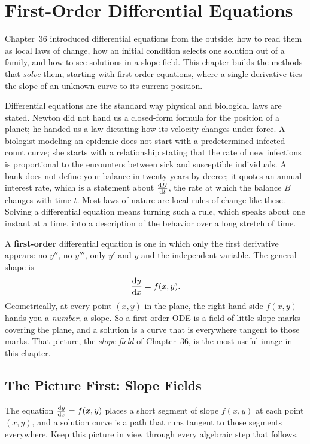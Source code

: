 \chapter{First-Order Differential Equations}

Chapter~36 introduced differential equations from the outside: how to read them
as local laws of change, how an initial condition selects one solution out of a
family, and how to see solutions in a slope field. This chapter builds the
methods that \emph{solve} them, starting with first-order equations,
where a single derivative ties the slope of an unknown curve to its current
position.

Differential equations are the standard way physical and biological laws are stated.
Newton did not hand us a closed-form formula for the position of a planet; he
handed us a law dictating how its velocity changes under force. A biologist
modeling an epidemic does not start with a predetermined infected-count curve;
she starts with a relationship stating that the rate of new infections is
proportional to the encounters between sick and susceptible individuals. A bank
does not define your balance in twenty years by decree; it quotes an annual
interest rate, which is a statement about $\frac{\mathrm{d} B}{\mathrm{d} t}$, the rate at which the
balance $B$ changes with time $t$. Most laws of nature are local rules of change
like these. Solving a differential equation means turning such a rule, which
speaks about one instant at a time, into a description of the behavior over a
long stretch of time.

A \textbf{first-order} differential equation is one in which only the first
derivative appears: no $y''$, no $y'''$, only $y'$ and $y$ and the independent
variable. The general shape is
\[
  \frac{\mathrm{d} y}{\mathrm{d} x} = f(x, y).
\]
Geometrically, at every point $(x,y)$ in the plane, the right-hand side $f(x,y)$
hands you a \emph{number}, a slope. So a first-order ODE is a field of
little slope marks covering the plane, and a solution is a curve that is
everywhere tangent to those marks. That picture, the \emph{slope field} of
Chapter~36, is the most useful image in this chapter.

\section{The Picture First: Slope Fields}

The equation $\frac{\mathrm{d} y}{\mathrm{d} x} = f(x,y)$ places a short segment of slope $f(x,y)$ at
each point $(x,y)$, and a solution curve is a path that runs tangent to those
segments everywhere. Keep this picture in view through every algebraic step
that follows.

